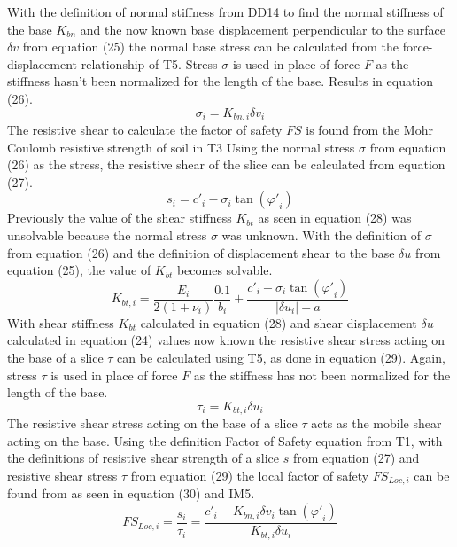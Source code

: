 \documentclass[12pt]{article}
\begin{document}
With the definition of normal stiffness from DD14 to find the normal stiffness of the base ${K_{bn}}$ and the now known base displacement perpendicular to the surface $\delta{}v$ from equation (25) the normal base stress can be calculated from the force-displacement relationship of T5. Stress $\sigma{}$ is used in place of force $F$ as the stiffness hasn't been normalized for the length of the base. Results in equation (26).
\begin{dmath}
\sigma{}_{i}={K_{bn,i}} {\delta{}v}_{i}
\end{dmath}
The resistive shear to calculate the factor of safety $FS$ is found from the Mohr Coulomb resistive strength of soil in T3 Using the normal stress $\sigma{}$ from equation (26) as the stress, the resistive shear of the slice can be calculated from equation (27).
\begin{dmath}
s_{i}={c'}_{i}-\sigma{}_{i} \tan\left({\varphi{}'}_{i}\right)
\end{dmath}
Previously the value of the shear stiffness ${K_{bt}}$ as seen in equation (28) was unsolvable because the normal stress $\sigma{}$ was unknown. With the definition of $\sigma{}$ from equation (26) and the definition of displacement shear to the base $\delta{}u$ from equation (25), the value of ${K_{bt}}$ becomes solvable.
\begin{dmath}
{K_{bt,i}}=\frac{E_{i}}{2 \left(1+\nu{}_{i}\right)} \frac{0.1}{b_{i}}+\frac{{c'}_{i}-\sigma{}_{i} \tan\left({\varphi{}'}_{i}\right)}{|{\delta{}u}_{i}|+a}
\end{dmath}
With shear stiffness ${K_{bt}}$ calculated in equation (28) and shear displacement $\delta{}u$ calculated in equation (24) values now known the resistive shear stress acting on the base of a slice $\tau{}$ can be calculated using T5, as done in equation (29). Again, stress $\tau{}$ is used in place of force $F$ as the stiffness has not been normalized for the length of the base.
\begin{dmath}
\tau{}_{i}={K_{bt,i}} {\delta{}u}_{i}
\end{dmath}
The resistive shear stress acting on the base of a slice $\tau{}$ acts as the mobile shear acting on the base. Using the definition Factor of Safety equation from T1, with the definitions of resistive shear strength of a slice $s$ from equation (27) and resistive shear stress $\tau{}$ from equation (29) the local factor of safety ${FS_{Loc,i}}$ can be found from as seen in equation (30) and IM5.
\begin{dmath}
{FS_{Loc,i}}=\frac{s_{i}}{\tau{}_{i}}=\frac{{c'}_{i}-{K_{bn,i}} {\delta{}v}_{i} \tan\left({\varphi{}'}_{i}\right)}{{K_{bt,i}} {\delta{}u}_{i}}
\end{dmath}
\end{document}
